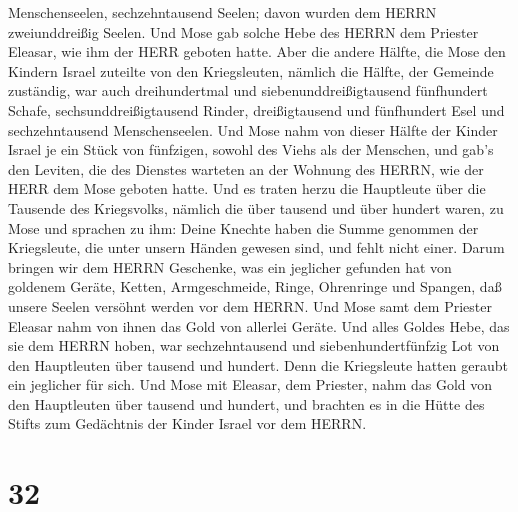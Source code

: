 Menschenseelen, sechzehntausend Seelen; davon wurden dem HERRN
zweiunddreißig Seelen.  Und Mose gab solche Hebe des HERRN
dem Priester Eleasar, wie ihm der HERR geboten hatte.  Aber
die andere Hälfte, die Mose den Kindern Israel zuteilte von den
Kriegsleuten,  nämlich die Hälfte, der Gemeinde zuständig,
war auch dreihundertmal und siebenunddreißigtausend fünfhundert Schafe,
 sechsunddreißigtausend Rinder, 
dreißigtausend und fünfhundert Esel  und sechzehntausend
Menschenseelen.  Und Mose nahm von dieser Hälfte der Kinder
Israel je ein Stück von fünfzigen, sowohl des Viehs als der Menschen,
und gab's den Leviten, die des Dienstes warteten an der Wohnung des
HERRN, wie der HERR dem Mose geboten hatte.  Und es traten
herzu die Hauptleute über die Tausende des Kriegsvolks, nämlich die über
tausend und über hundert waren, zu Mose  und sprachen zu
ihm: Deine Knechte haben die Summe genommen der Kriegsleute, die unter
unsern Händen gewesen sind, und fehlt nicht einer.  Darum
bringen wir dem HERRN Geschenke, was ein jeglicher gefunden hat von
goldenem Geräte, Ketten, Armgeschmeide, Ringe, Ohrenringe und Spangen,
daß unsere Seelen versöhnt werden vor dem HERRN.  Und Mose
samt dem Priester Eleasar nahm von ihnen das Gold von allerlei Geräte.
 Und alles Goldes Hebe, das sie dem HERRN hoben, war
sechzehntausend und siebenhundertfünfzig Lot von den Hauptleuten über
tausend und hundert.  Denn die Kriegsleute hatten geraubt
ein jeglicher für sich.  Und Mose mit Eleasar, dem
Priester, nahm das Gold von den Hauptleuten über tausend und hundert,
und brachten es in die Hütte des Stifts zum Gedächtnis der Kinder Israel
vor dem HERRN.

\hypertarget{section-31}{%
\section{32}\label{section-31}}


